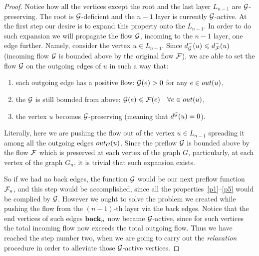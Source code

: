 \documentclass[12pt]{article}
\begin{document}
\begin{proof}
      Notice how all the vertices except the root and the last layer $L_{n-1}$ are $\cal{G}$-preserving.
      The root is $\cal{G}$-deficient and the $n-1$ layer is currently $\cal{G}$-active.
      At the first step our desire is to expand this property onto the $L_{n-1}$.
      In order to do such expansion we will propagate the flow $\cal{G}$, incoming to the $n-1$ layer, one edge further.
      Namely, consider the vertex $u \in L_{n-1}$.
      Since $d_{\cal{G}}^{-}(u) \leq d_{\flowpos}^{-}(u)$ (incoming flow $\cal{G}$ is bounded above by the original flow $\flowpos$),
        we are able to set the flow $\cal{G}$ on the outgoing edges of $u$ in such a way that:
      \begin{enumerate}[label=\textbf{(\roman*)}]
        \item\label{posprop} each outgoing edge has a positive flow: $\cal{G}(e) > 0$ for any $e \in \eout(u)$,
        \item the $\cal{G}$ is still bounded from above: 
          $\cal{G}(e) \leq \flowpos(e) \quad \forall e \in \eout(u)$,
        \item the vertex $u$ becomes $\cal{G}$-preserving (meaning that $d^{\cal{G}}(u) = 0$).
      \end{enumerate}
      \begin{note}
        Literally, here we are pushing the flow out of the vertex $u \in L_{n-1}$ spreading it among all the outgoing edges
          $\eout_G(u)$.
        Since the preflow $\cal{G}$ is bounded above by the flow $\flowpos$ which is preserved at each vertex of the graph $G$,
          particularly, at each vertex of the graph $G_n$, it is trivial that such expansion exists.
      \end{note}
      So if we had no back edges, the function $\cal{G}$ would be our next preflow function $\flowposn{n}$, and this step would be accomplished,
        since all the properties~\ref{p1}--\ref{p5} would be complied by $\cal{G}$.
      However we ought to solve the problem we created while pushing the flow from the $(n-1)$-th layer via the back edges.
      Notice that the end vertices of such edges $\eback_{n}$ now became $\cal{G}$-active, since for such vertices
        the total incoming flow now exceeds the total outgoing flow.
      Thus we have reached the step number two, when we are going to carry out the \emph{relaxation} procedure in order to alleviate those $\cal{G}$-active
        vertices.


\end{proof}
\end{document}
